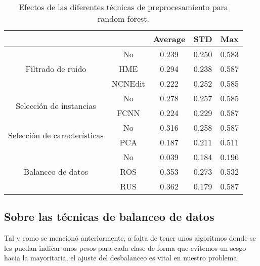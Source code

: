 \begin{table}
    \centering
    \begin{tabular}{cc|c|c|c|}
    \cline{3-5}
    \multicolumn{1}{l}{\textbf{}} & \textbf{} & \multicolumn{1}{c|}{\textbf{Average}} & \multicolumn{1}{c|}{\textbf{STD}} & \textbf{Max} \\ \hline
    \multicolumn{1}{|c|}{\multirow{3}{*}{Filtrado de ruido}}       & No        & 0.239  & 0.250
    & 0.583    \\ \cline{2-5} 
    \multicolumn{1}{|c|}{}  & HME       & 0.294  & 0.238
    & 0.587        \\ \cline{2-5} 
    \multicolumn{1}{|c|}{}  & NCNEdit   & 0.222  & 0.252
    & 0.585        \\ \hline
    \multicolumn{1}{|c|}{\multirow{2}{*}{Selección de instancias}} & No        & 0.278   & 0.257
    & 0.585        \\ \cline{2-5} 
    \multicolumn{1}{|c|}{}  & FCNN      & 0.224  & 0.229
    & 0.587        \\ \hline
    \multicolumn{1}{|c|}{\multirow{2}{*}{Selección de características}} & No        & 0.316  &  0.258
    & 0.587        \\ \cline{2-5} 
    \multicolumn{1}{|c|}{}  & PCA      & 0.187   & 0.211
    & 0.511        \\ \hline
    \multicolumn{1}{|c|}{\multirow{3}{*}{Balanceo de datos}}       & No        & 0.039  & 0.184
    & 0.196        \\ \cline{2-5} 
    \multicolumn{1}{|c|}{}  & ROS       & 0.353  & 0.273
    & 0.532        \\ \cline{2-5} 
    \multicolumn{1}{|c|}{}  & RUS       & 0.362  & 0.179
    & 0.587        \\ \hline
    \end{tabular}
    \caption{Efectos de las diferentes técnicas de preprocesamiento para random forest.}
    \label{rf}
\end{table}

\subsection{Sobre las técnicas de balanceo de datos}

Tal y como se mencionó anteriormente, a falta de tener unos algoritmos donde se les puedan indicar unos pesos para cada clase de forma que evitemos un sesgo hacia la mayoritaria, el ajuste del desbalanceo es vital en nuestro problema.

\vspace{\baselineskip}

